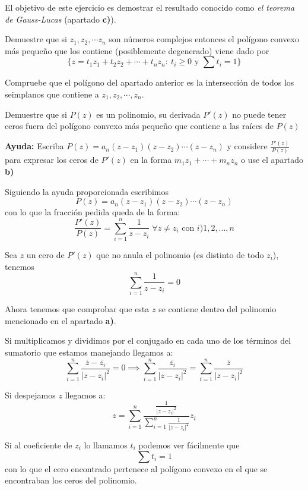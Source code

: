 \begin{problem}[4]
El objetivo de este ejercicio es demostrar el resultado conocido como \textit{el teorema de Gauss-Lucas} (apartado \textbf{c)}).

\ppart Demuestre que si $z_1,z_2,\cdots z_n$ son números complejos entonces el polígono convexo más pequeño que los contiene (posiblemente degenerado) viene dado por
\[\{z=t_1z_1+t_2z_2+\cdots + t_nz_n : \ t_i \geq 0 \text{ y } \sum t_i = 1\}\]

\ppart Compruebe que el polígono del apartado anterior es la intersección de todos los seimplanos que contiene a  $z_1,z_2,\cdots, z_n$.

\ppart Demuestre que si $P(z)$ es un polinomio, su derivada $P'(z)$ no puede tener ceros fuera del polígono convexo más pequeño que contiene a las raíces de $P(z)$

\textbf{Ayuda:} Escriba $P(z)=a_n(z-z_1)(z-z_2)\cdots (z-z_n)$ y considere $\frac{P'(z)}{P(z)}$ para expresar los ceros de $P'(z)$ en la forma $m_1z_1+\cdots + m_nz_n$ o use el apartado \textbf{b)}

\solution

\spart

\spart

\spart
Siguiendo la ayuda proporcionada escribimos
\[P(z)=a_n(z-z_1)(z-z_2)\cdots (z-z_n)\]
con lo que la fracción pedida queda de la forma:
\[\frac{P'(z)}{P(z)}=\sum_{i=1}^n \frac{1}{z-z_i} \; \forall z \neq z_i \text{ con } i)1,2,...,n\]

Sea $z$ un cero de $P'(z)$ que no anula el polinomio (es distinto de todo $z_i$), tenemos
\[\sum_{i=1}^n \frac{1}{z-z_i}=0\]

Ahora tenemos que comprobar que esta $z$ se contiene dentro del polinomio mencionado en el apartado \textbf{a)}.

Si multiplicamos y dividimos por el conjugado en cada uno de los términos del sumatorio que estamos manejando llegamos a:
\[\sum_{i=1}^n \frac{\bar{z}-\bar{z_i}}{|z-z_i|^2} = 0 \implies  \sum_{i=1}^n \frac{\bar{z_i}}{|z-z_i|^2} = \sum_{i=1}^n \frac{\bar{z}}{|z-z_i|^2}  \]

Si despejamos $z$ llegamos a:
\[z= \sum_{i=1}^n \frac{\frac{1}{|z-z_i|^2}}{\sum_{i=1}^n \frac{1}{|z-z_i|^2}}z_i\]

Si al coeficiente de $z_i$ lo llamamos $t_i$ podemos ver fácilmente que
\[\sum t_i = 1\]
con lo que el cero encontrado pertenece al polígono convexo en el que se encontraban los ceros del polinomio.
\end{problem}


